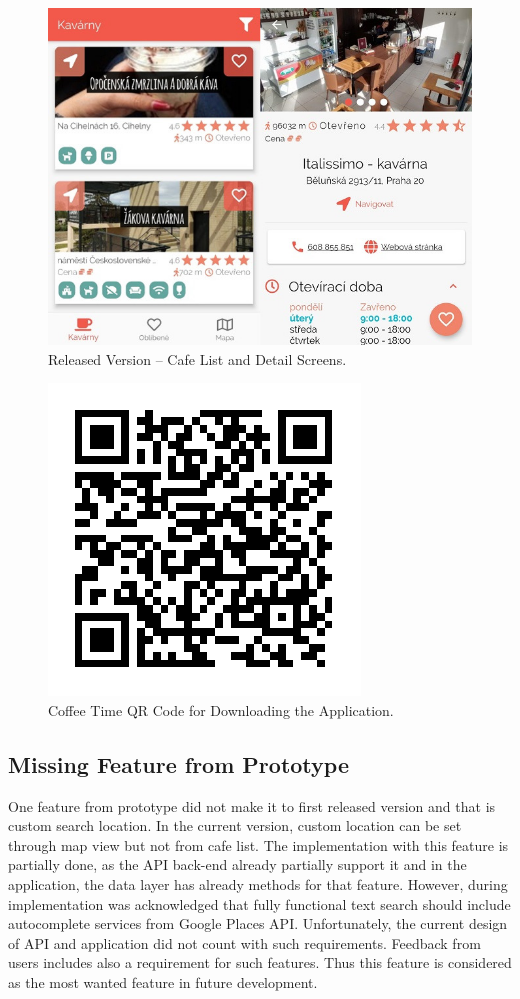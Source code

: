 \begin{figure}[h!]
    \centering
    \includegraphics[width=\textwidth]{img/deploy/app.jpg}
    \caption{Released Version -- Cafe List and Detail Screens.}
    \label{fig:ct-released-version}
\end{figure}

\begin{figure}[h!]
    \centering
    \includegraphics[width=0.33\linewidth]{img/deploy/app-qr.pdf}
    \caption{Coffee Time QR Code for Downloading the Application.}
    \label{fig:ct-qr-code}
\end{figure}

\subsection{Missing Feature from Prototype}
One feature from prototype did not make it to first released version and that is custom search location. In the current version, custom location can be set through map view but not from cafe list. The implementation with this feature is partially done, as the API back-end already partially support it and in the application, the data layer has already methods for that feature.  
However, during implementation was acknowledged that fully functional text search should include autocomplete services from Google Places API. Unfortunately, the current design of API and application did not count with such requirements. Feedback from users includes also a requirement for such features. Thus this feature is considered as the most wanted feature in future development. 

